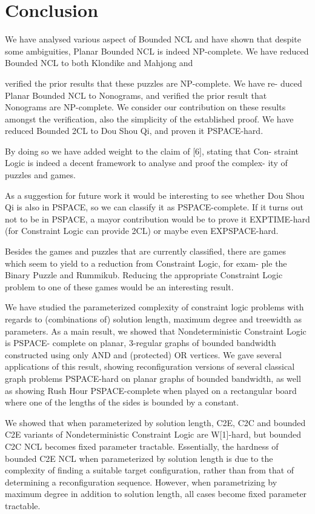 \chapter{Conclusion}
We have analysed various aspect of Bounded NCL and have shown that
despite some ambiguities, Planar Bounded NCL is indeed NP-complete.
We have reduced Bounded NCL to both Klondike and Mahjong and

veriﬁed the prior results that these puzzles are NP-complete. We have re-
duced Planar Bounded NCL to Nonograms, and veriﬁed the prior result that
Nonograms are NP-complete. We consider our contribution on these results
amongst the veriﬁcation, also the simplicity of the established proof. We have
reduced Bounded 2CL to Dou Shou Qi, and proven it PSPACE-hard.

By doing so we have added weight to the claim of [6], stating that Con-
straint Logic is indeed a decent framework to analyse and proof the complex-
ity of puzzles and games.

As a suggestion for future work it would be interesting to see whether
Dou Shou Qi is also in PSPACE, so we can classify it as PSPACE-complete.
If it turns out not to be in PSPACE, a mayor contribution would be to prove
it EXPTIME-hard (for Constraint Logic can provide 2CL) or maybe even
EXPSPACE-hard.

Besides the games and puzzles that are currently classiﬁed, there are
games which seem to yield to a reduction from Constraint Logic, for exam-
ple the Binary Puzzle and Rummikub. Reducing the appropriate Constraint
Logic problem to one of these games would be an interesting result.

We have studied the parameterized complexity of constraint logic problems with regards
to (combinations of) solution length, maximum degree and treewidth as parameters. As
a main result, we showed that Nondeterministic Constraint Logic is PSPACE-
complete on planar, 3-regular graphs of bounded bandwidth constructed using only
AND and (protected) OR vertices. We gave several applications of this result, showing
reconﬁguration versions of several classical graph problems PSPACE-hard on planar
graphs of bounded bandwidth, as well as showing Rush Hour PSPACE-complete when
played on a rectangular board where one of the lengths of the sides is bounded by a
constant.

We showed that when parameterized by solution length, C2E, C2C and bounded C2E
variants of Nondeterministic Constraint Logic are W[1]-hard, but bounded C2C
NCL becomes ﬁxed parameter tractable. Essentially, the hardness of bounded C2E NCL
when parameterized by solution length is due to the complexity of ﬁnding a suitable
target conﬁguration, rather than from that of determining a reconﬁguration sequence.
However, when parametrizing by maximum degree in addition to solution length, all
cases become ﬁxed parameter tractable.

